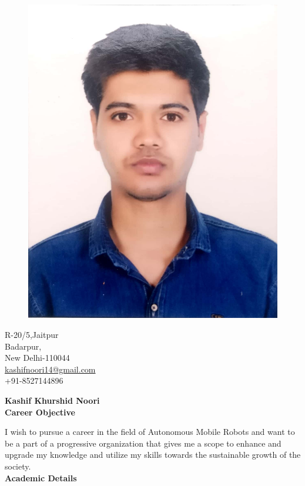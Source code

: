\documentclass[a4paper,12pt,final]{memoir}
\newcommand{\SmallSep}{\vspace{0.5em}}
\newcommand{\CVSection}[1]
	{\Large\textbf{#1}\par
	\SmallSep\normalsize\normalfont}
\begin{document}
\begin{figure}
	\hfill
	\center
	\includegraphics[width=0.6\columnwidth]{kashif}
	\vspace{-7cm}	
	

\end{figure}

\begin{center}\small
	R-20/5,Jaitpur \\
	\hspace{-5pt}Badarpur,\\New Delhi-110044	\\\vspace{1pt}
	\url{kashifnoori14@gmail.com}\\\vspace{1pt}
	+91-8527144896	
	 
\end{center}\normalsize
\framebreak
\Huge\bfseries {\color{RoyalBlue} Kashif Khurshid Noori} \\

\normalsize\normalfont
\CVSection{Career Objective}
I wish to pursue a career in the field of Autonomous Mobile Robots and want to be a part of a progressive organization that gives me a scope to enhance and upgrade my knowledge and utilize my skills towards the sustainable growth of the society.\\

\CVSection{Academic Details}
\end{document}
